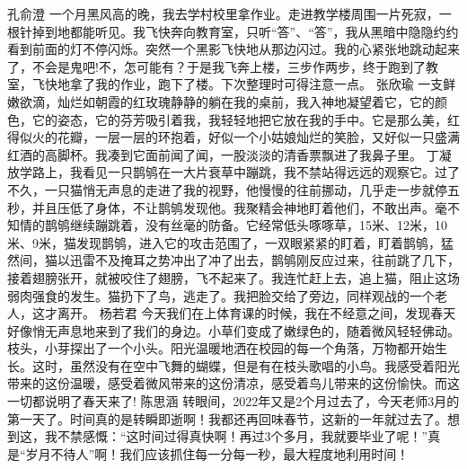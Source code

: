 {}孔俞澄\markdownRendererInterblockSeparator
{}一个月黑风高的晚，我去学村校里拿作业。走进教学楼周围一片死寂，一根针掉到地都能听见。我飞快奔向教育室，只听“答”、“答”，我从黑暗中隐隐约约看到前面的灯不停闪烁。突然一个黑影飞快地从那边闪过。我的心紧张地跳动起来了，不会是鬼吧!不，怎可能有？于是我飞奔上楼，三步作两步，终于跑到了教室，飞快地拿了我的作业，跑下了楼。下次整理时可得注意一点。\markdownRendererInterblockSeparator
{}\markdownRendererInterblockSeparator
{}张欣瑜\markdownRendererInterblockSeparator
{}一支鲜嫩欲滴，灿烂如朝霞的红玫瑰静静的躺在我的桌前，我入神地凝望着它，它的颜色，它的姿态，它的芬芳吸引着我，我轻轻地把它放在我的手中。它是那么美，红得似火的花瓣，一层一层的环抱着，好似一个小姑娘灿烂的笑脸，又好似一只盛满红酒的高脚杯。我凑到它面前闻了闻，一股淡淡的清香票飘进了我鼻子里。\markdownRendererInterblockSeparator
{}\markdownRendererInterblockSeparator
{}丁凝\markdownRendererInterblockSeparator
{}放学路上，我看见一只鹊鸲在一大片衰草中蹦跳，我不禁站得远远的观察它。过了不久，一只猫悄无声息的走进了我的视野，他慢慢的往前挪动，几乎走一步就停五秒，并且压低了身体，不让鹊鸲发现他。我聚精会神地盯着他们，不敢出声。毫不知情的鹊鸲继续蹦跳着，没有丝毫的防备。它经常低头啄啄草，15米、12米，10米、9米，猫发现鹊鸲，进入它的攻击范围了，一双眼紧紧的盯着，盯着鹊鸲，猛然间，猫以迅雷不及掩耳之势冲出了冲了出去，鹊鸲刚反应过来，往前跳了几下，接着翅膀张开，就被咬住了翅膀，飞不起来了。我连忙赶上去，追上猫，阻止这场弱肉强食的发生。猫扔下了鸟，逃走了。我把脸交给了旁边，同样观战的一个老人，这才离开。\markdownRendererInterblockSeparator
{}\markdownRendererInterblockSeparator
{}杨若君\markdownRendererInterblockSeparator
{}今天我们在上体育课的时候，我在不经意之间，发现春天好像悄无声息地来到了我们的身边。小草们变成了嫩绿色的，随着微风轻轻佛动。枝头，小芽探出了一个小头。阳光温暖地洒在校园的每一个角落，万物都开始生长。这时，虽然没有在空中飞舞的蝴蝶，但是有在枝头歌唱的小鸟。我感受着阳光带来的这份温暖，感受着微风带来的这份清凉，感受着鸟儿带来的这份愉快。而这一切都说明了春天来了!\markdownRendererInterblockSeparator
{}\markdownRendererInterblockSeparator
{}陈思涵\markdownRendererInterblockSeparator
{}转眼间，2022年又是2个月过去了，今天老师3月的第一天了。时间真的是转瞬即逝啊！我都还再回味春节，这新的一年就过去了。想到这，我不禁感慨：“这时间过得真快啊！再过3个多月，我就要毕业了呢！”真是“岁月不待人”啊！我们应该抓住每一分每一秒，最大程度地利用时间！\markdownRendererInterblockSeparator
{}\markdownRendererInterblockSeparator
